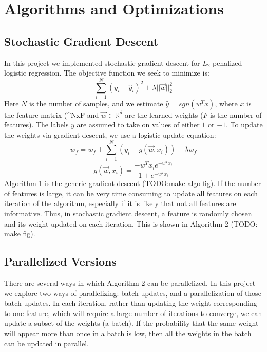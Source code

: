 \documentclass{article}
\begin{document}
\section{Algorithms and Optimizations}
\subsection{Stochastic Gradient Descent}
In this project we implemented stochastic gradient descent for $L_2$ penalized logistic regression. The objective function we seek to minimize is:
\begin{equation}
\sum_{i = 1}^{N}(y_i - \hat{y}_i)^2 + \lambda||\vec{w}||_2^2
\end{equation}
Here $N$ is the number of samples, and we estimate $\hat{y} = sgn(w^Tx)$, where $x$ is the feature matrix (\in {}^{NxF} and $\vec{w} \in \mathbb{R}^d$ are the learned weights ($F$ is the number of features). The labels $y$ are assumed to take on values of either $1$ or $-1$. To update the weights via gradient descent, we use a logistic update equation:
\begin{equation}
w_f = w_f + \sum_{i = 1}^{N}(y_i - g(\vec{w}, x_i)) + \lambda w_f
\end{equation}
\begin{equation}
g(\vec{w}, x_i) = \frac{-w^Tx_ie^{-w^Tx_i}}{1 + e^{-w^Tx_i}}
\end{equation}
Algorithm 1 is the generic gradient descent (TODO:make algo fig). If the number of features is large, it can be very time consuming to update all features on each iteration of the algorithm, especially if it is likely that not all features are informative.  Thus, in stochastic gradient descent, a feature is randomly chosen and its weight updated on each iteration. This is shown in Algorithm 2 (TODO: make fig). %
\subsection{Parallelized Versions}
There are several ways in which Algorithm 2 can be parallelized. In this project we explore two ways of parallelizing: batch updates, and a parallelization of those batch updates.  In each iteration, rather than updating the weight corresponding to one feature, which will require a large number of iterations to converge, we can update a subset of the weights (a batch).  If the probability that the same weight will appear more than once in a batch is low, then all the weights in the batch can be updated in parallel. %
\end{document}
